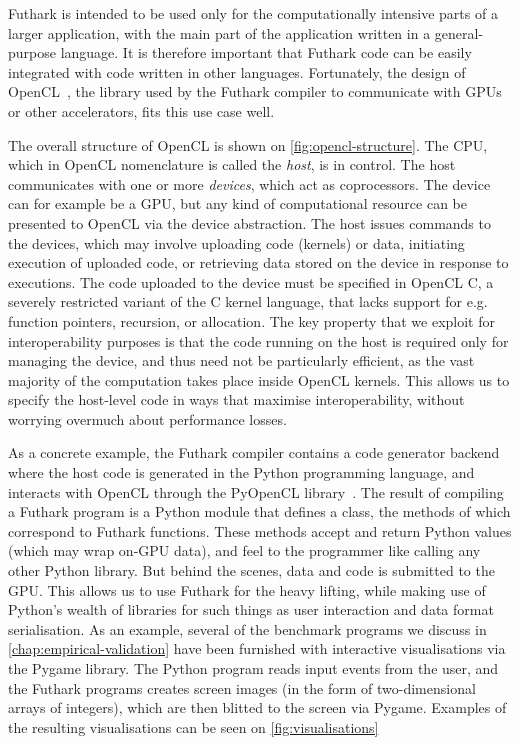 Futhark is intended to be used only for the computationally intensive
parts of a larger application, with the main part of the application
written in a general-purpose language.  It is therefore important that
Futhark code can be easily integrated with code written in other
languages.  Fortunately, the design of
OpenCL~\cite{Stone:2010:OPP:622179.1803953}, the library used by the
Futhark compiler to communicate with GPUs or other accelerators, fits
this use case well.

The overall structure of OpenCL is shown on
\cref{fig:opencl-structure}.  The CPU, which in OpenCL nomenclature is
called the \textit{host}, is in control.  The host communicates with
one or more \textit{devices}, which act as coprocessors.  The device
can for example be a GPU, but any kind of computational resource can
be presented to OpenCL via the device abstraction.  The host issues
commands to the devices, which may involve uploading code (kernels) or
data, initiating execution of uploaded code, or retrieving data stored
on the device in response to executions.  The code uploaded to the
device must be specified in OpenCL C, a severely restricted variant of
the C kernel language, that lacks support for e.g. function pointers,
recursion, or allocation.  The key property that we exploit for
interoperability purposes is that the code running on the host is
required only for managing the device, and thus need not be
particularly efficient, as the vast majority of the computation takes
place inside OpenCL kernels.  This allows us to specify the host-level
code in ways that maximise interoperability, without worrying overmuch
about performance losses.

As a concrete example, the Futhark compiler contains a code generator
backend where the host code is generated in the Python programming
language, and interacts with OpenCL through the PyOpenCL
library~\cite{kloeckner_pycuda_2012}.  The result of compiling a
Futhark program is a Python module that defines a class, the methods
of which correspond to Futhark functions.  These methods accept and
return Python values (which may wrap on-GPU data), and feel to the
programmer like calling any other Python library.  But behind the
scenes, data and code is submitted to the GPU.  This allows us to use
Futhark for the heavy lifting, while making use of Python's wealth of
libraries for such things as user interaction and data format
serialisation.  As an example, several of the benchmark programs we
discuss in \ref{chap:empirical-validation} have been furnished with
interactive visualisations via the Pygame library.  The Python program
reads input events from the user, and the Futhark programs creates
screen images (in the form of two-dimensional arrays of integers),
which are then blitted to the screen via Pygame.  Examples of the
resulting visualisations can be seen on \cref{fig:visualisations}

